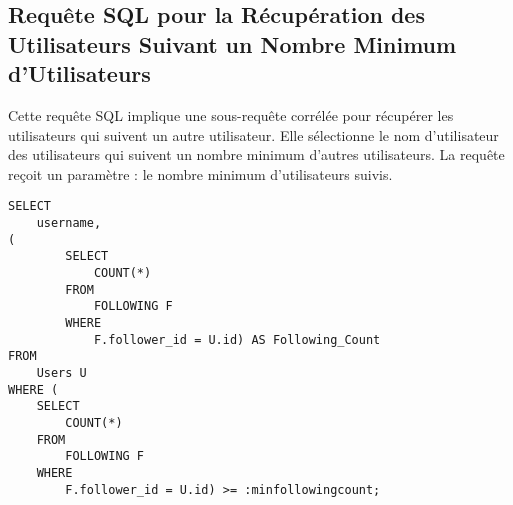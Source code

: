 \subsection{Requête SQL pour la Récupération des Utilisateurs Suivant un Nombre Minimum d'Utilisateurs}

Cette requête SQL implique une sous-requête corrélée pour récupérer les utilisateurs qui suivent un autre utilisateur. Elle sélectionne le nom d'utilisateur des utilisateurs qui suivent un nombre minimum d'autres utilisateurs. La requête reçoit un paramètre : le nombre minimum d'utilisateurs suivis.

\begin{lstlisting}
SELECT
    username,
(
        SELECT
            COUNT(*)
        FROM
            FOLLOWING F
        WHERE
            F.follower_id = U.id) AS Following_Count
FROM
    Users U
WHERE (
    SELECT
        COUNT(*)
    FROM
        FOLLOWING F
    WHERE
        F.follower_id = U.id) >= :minfollowingcount;
\end{lstlisting}